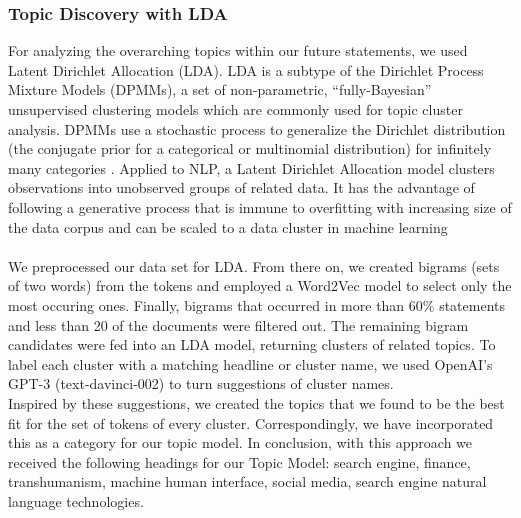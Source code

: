 \subsubsection{Topic Discovery with LDA}
\label{lda}
For analyzing the overarching topics within our future statements, we used Latent Dirichlet Allocation (LDA). LDA is a subtype of the Dirichlet Process Mixture Models (DPMMs), a set of non-parametric, “fully-Bayesian” unsupervised clustering models which are commonly used for topic cluster analysis. DPMMs use a stochastic process to generalize the Dirichlet distribution (the conjugate prior for a categorical or multinomial distribution) for infinitely many categories \citep{li2019tutorial}.
Applied to NLP, a Latent Dirichlet Allocation model clusters observations into unobserved groups of related data. It has the advantage of following a generative process that is immune to overfitting with increasing size of the data corpus and can be scaled to a data cluster in machine learning \citep{pritchard2000inference}
\\
\\
We preprocessed our data set for LDA.
From there on, we created bigrams (sets of two words) from the tokens and employed a Word2Vec model to select only the most occuring ones.
Finally, bigrams that occurred in more than 60\% statements and less than 20 of the documents were filtered out. The remaining bigram candidates were fed into an LDA model, returning clusters of related topics. To label each cluster with a matching headline or cluster name, we used OpenAI’s GPT-3 (text-davinci-002) to turn suggestions of cluster names.
\\
Inspired by these suggestions, we created the topics that we found to be the best fit for the set of tokens of every cluster.
Correspondingly, we have incorporated this as a category for our topic model.
In conclusion, with this approach we received the following headings for our Topic Model: search engine, finance, transhumanism, machine human interface, social media, search engine natural language technologies.


